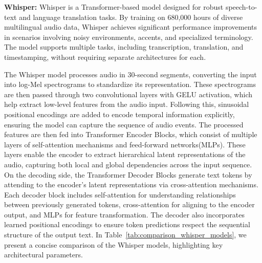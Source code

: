 \documentclass[10pt,twocolumn,letterpaper]{article}
\begin{document}
\textbf{Whisper:}
Whisper is a Transformer-based model designed for robust speech-to-text and language translation tasks\cite{IndroducingWhisper, MediumWhisper}. By training on 680,000 hours of diverse multilingual audio data, Whisper achieves significant performance improvements in scenarios involving noisy environments, accents, and specialized terminology. The model supports multiple tasks, including transcription, translation, and timestamping, without requiring separate architectures for each.

The Whisper model processes audio in 30-second segments, converting the input into log-Mel spectrograms to standardize its representation. These spectrograms are then passed through two convolutional layers with GELU activation, which help extract low-level features from the audio input. Following this, sinusoidal positional encodings are added to encode temporal information explicitly, ensuring the model can capture the sequence of audio events.
The processed features are then fed into Transformer Encoder Blocks, which consist of multiple layers of self-attention mechanisms and feed-forward networks(MLPs). These layers enable the encoder to extract hierarchical latent representations of the audio, capturing both local and global dependencies across the input sequence.
On the decoding side, the Transformer Decoder Blocks generate text tokens by attending to the encoder’s latent representations via cross-attention mechanisms. Each decoder block includes self-attention for understanding relationships between previously generated tokens, cross-attention for aligning to the encoder output, and MLPs for feature transformation. The decoder also incorporates learned positional encodings to ensure token predictions respect the sequential structure of the output text.
In Table~\ref{tab:comparison_whisper_models}, we present a concise comparison of the Whisper models, highlighting key architectural parameters.

\begin{table}[ht]
\centering
{}
\caption{Comparison of Whisper models}
\label{tab:comparison_whisper_models}
\end{table}
\end{document}
